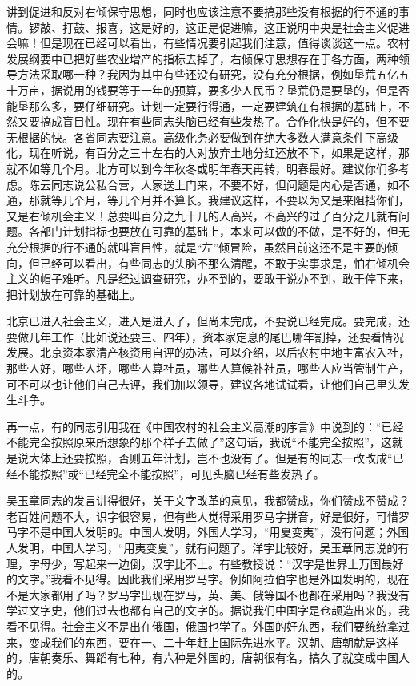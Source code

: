 讲到促进和反对右倾保守思想，同时也应该注意不要搞那些没有根据的行不通的事情。锣敲、打鼓、报喜，这是好的，这正是促进嘛，这正说明中央是社会主义促进会嘛！但是现在已经可以看出，有些情况要引起我们注意，值得谈谈这一点。农村发展纲要中已把好些农业增产的指标去掉了，右倾保守思想存在于各方面，两种领导方法采取哪一种？我因为其中有些还没有研究，没有充分根据，例如垦荒五亿五十万亩，据说用的钱要等于一年的预算，要多少人民币？垦荒仍是要垦的，但是否能垦那么多，要仔细研究。计划一定要行得通，一定要建筑在有根据的基础上，不然又要搞成盲目性。现在有些同志头脑已经有些发热了。合作化快是好的，但不要无根据的快。各省同志要注意。高级化务必要做到在绝大多数人满意条件下高级化，现在听说，有百分之三十左右的人对放弃土地分红还放不下，如果是这样，那就不如等几个月。北方可以到今年秋冬或明年春天再转，明春最好。建议你们多考虑。陈云同志说公私合营，人家送上门来，不要不好，但问题是内心是否通，如不通，那就等几个月，等几个月并不算长。我建议这样，不要以为又是来阻挡你们，又是右倾机会主义！总要叫百分之九十几的人高兴，不高兴的过了百分之几就有问题。各部门计划指标也要放在可靠的基础上，本来可以做的不做，是不好的，但无充分根据的行不通的就叫盲目性，就是“左”倾冒险，虽然目前这还不是主要的倾向，但已经可以看出，有些同志的头脑不那么清醒，不敢于实事求是，怕右倾机会主义的帽子难听。凡是经过调查研究，办不到的，要敢于说办不到，敢于停下来，把计划放在可靠的基础上。

北京已进入社会主义，进入是进入了，但尚未完成，不要说已经完成。要完成，还要做几年工作（比如说还要三、四年），资本家定息的尾巴哪年割掉，还要看情况发展。北京资本家清产核资用自评的办法，可以介绍，以后农村中地主富农入社，那些人好，哪些人坏，哪些人算社员，哪些人算候补社员，哪些人应当管制生产，可不可以也让他们自己去评，我们加以领导，建议各地试试看，让他们自己里头发生斗争。

再一点，有的同志引用我在《中国农村的社会主义高潮的序言》中说到的：“已经不能完全按照原来所想象的那个样子去做了”这句话，我说“不能完全按照”，这就是说大体上还要按照，否则五年计划，岂不也没有了。但是有的同志一改改成“已经不能按照”或“已经完全不能按照”，可见头脑已经有些发热了。

吴玉章同志的发言讲得很好，关于文字改革的意见，我都赞成，你们赞成不赞成？老百姓问题不大，识字很容易，但有些人觉得采用罗马字拼音，好是很好，可惜罗马字不是中国人发明的。中国人发明，外国人学习，“用夏变夷”，没有问题；外国人发明，中国人学习，“用夷变夏”，就有问题了。洋字比较好，吴玉章同志说的有理，字母少，写起来一边倒，汉字比不上。有些教授说：“汉字是世界上万国最好的文字。”我看不见得。因此我们采用罗马字。例如阿拉伯字也是外国发明的，现在不是大家都用了吗？罗马字出现在罗马，英、美、俄等国不也都在采用吗？我没有学过文字史，他们过去也都有自己的文字的。据说我们中国字是仓颉造出来的，我看不见得。社会主义不是出在俄国，俄国也学了。外国的好东西，我们要统统拿过来，变成我们的东西，要在一、二十年赶上国际先进水平。汉朝、唐朝就是这样的，唐朝奏乐、舞蹈有七种，有六种是外国的，唐朝很有名，搞久了就变成中国人的。

